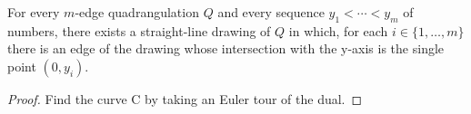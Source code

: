 \documentclass{patmorin}
\begin{document}
\begin{cor}
   For every $m$-edge quadrangulation $Q$ and every sequence
   $y_1<\cdots<y_m$ of numbers, there exists a straight-line drawing of $Q$
   in which, for each $i\in\{1,\ldots,m\}$ there is an edge of the drawing
   whose intersection with the y-axis is the single point $(0,y_i)$.
\end{cor}

\begin{proof}
  Find the curve C by taking an Euler tour of the dual.
\end{proof}



%
%
%
%
%
\end{document}
